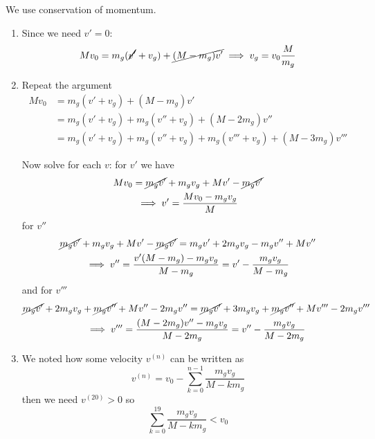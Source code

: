 \documentclass[10pt]{extarticle}
\begin{document}
\begin{solution}
    We use conservation of momentum.
    \begin{enumerate}
        \item Since we need $v' = 0$:
              \begin{equation}
                  Mv_0 = m_g (\cancel{v'} + v_g) + \cancel{(M - m_g) v'} \implies v_g = v_0\frac{M}{m_g}
              \end{equation}
        \item Repeat the argument
              \begin{align}
                  Mv_0 & = m_g (v' + v_g) + (M - m_g) v'                                        \\
                       & =  m_g (v' + v_g) + m_g(v'' + v_g) + (M - 2m_g) v''                    \\
                       & =  m_g (v' + v_g) + m_g(v'' + v_g) + m_g(v''' + v_g) + (M - 3m_g) v'''
              \end{align}

              Now solve for each $v$: for $v'$ we have
              \begin{multline}
                  Mv_0 = \cancel{m_g v'} + m_g v_g + M v' - \cancel{m_g v'} \\
                  \implies v' = \frac{Mv_0 - m_g v_g}{M}
              \end{multline}
              for $v''$
              \begin{multline}
                  \cancel{m_g v'} + m_g v_g + M v' - \cancel{m_g v'} =  m_g v' + 2m_g v_g - m_g v'' + M v'' \\
                  \implies v'' = \frac{v'(M - m_g) - m_g v_g}{ M - m_g} = v' - \frac{m_g v_g}{M - m_g}
              \end{multline}
              and for $v'''$
              \begin{multline}
                  \cancel{m_g v'} + 2m_g v_g + \cancel{m_g v''} + M v'' - 2m_g v'' = \cancel{m_g v'} + 3m_g v_g + \cancel{m_g v''} + M v''' - 2m_g v''' \\
                  \implies v''' = \frac{(M -2m_g)v'' - m_g v_g}{M - 2m_g} = v'' - \frac{m_g v_g}{M - 2m_g}
              \end{multline}
        \item We noted how some velocity $v^{(n)}$ can be written as
              \begin{equation}
                  v^{(n)} = v_0 - \sum_{k = 0}^{n-1} \frac{m_g v_g}{M - k m_g}
              \end{equation}
              then we need $v^{(20)} > 0$ so
              \begin{equation}
                  \sum_{k = 0}^{19} \frac{m_g v_g}{M - k m_g} < v_0
              \end{equation}
    \end{enumerate}
\end{solution}
\end{document}
